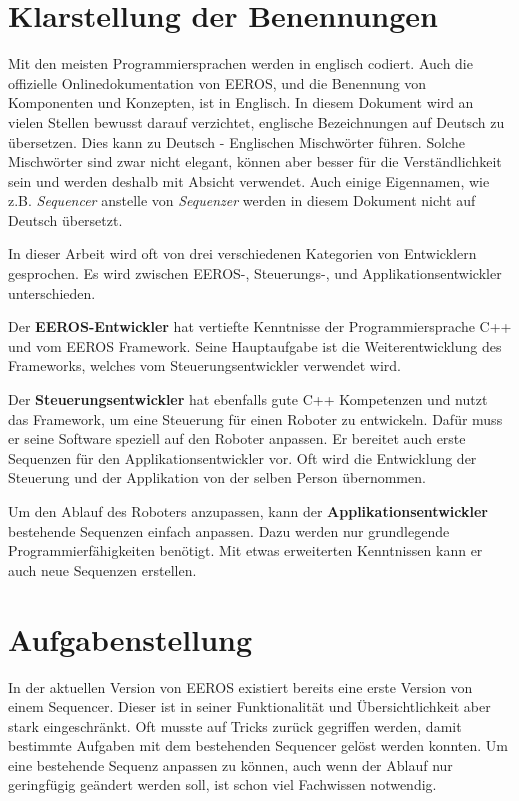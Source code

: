 \section{Klarstellung der Benennungen}
Mit den meisten Programmiersprachen werden in englisch codiert.
Auch die offizielle Onlinedokumentation \cite{eerosOrg} von EEROS, und die Benennung von Komponenten und Konzepten,  ist in Englisch.
In diesem Dokument wird an vielen Stellen bewusst darauf verzichtet, englische Bezeichnungen auf Deutsch zu übersetzen.
Dies kann zu Deutsch - Englischen Mischwörter führen.
Solche Mischwörter sind zwar nicht elegant, können aber besser für die Verständlichkeit sein und werden deshalb mit Absicht verwendet.
Auch einige Eigennamen, wie z.B. \textit{Sequencer} anstelle von \textit{Sequenzer} werden in diesem Dokument nicht auf Deutsch übersetzt.

In dieser Arbeit wird oft von drei verschiedenen Kategorien von Entwicklern gesprochen.
Es wird zwischen EEROS-, Steuerungs-, und Applikationsentwickler unterschieden.

Der \textbf{EEROS-Entwickler} hat vertiefte Kenntnisse der Programmiersprache C++ und vom EEROS Framework.
Seine Hauptaufgabe ist die Weiterentwicklung des Frameworks, welches vom Steuerungsentwickler verwendet wird.

Der \textbf{Steuerungsentwickler} hat ebenfalls gute C++ Kompetenzen und nutzt das Framework, um eine Steuerung für einen Roboter zu entwickeln.
Dafür muss er seine Software speziell auf den Roboter anpassen.
Er bereitet auch erste Sequenzen für den Applikationsentwickler vor.
Oft wird die Entwicklung der Steuerung und der Applikation von der selben Person übernommen.

Um den Ablauf des Roboters anzupassen, kann der \textbf{Applikationsentwickler} bestehende Sequenzen einfach anpassen.
Dazu werden nur grundlegende Programmierfähigkeiten benötigt.
Mit etwas erweiterten Kenntnissen kann er auch neue Sequenzen erstellen.



\section{Aufgabenstellung}
In der aktuellen Version von EEROS existiert bereits eine erste Version von einem Sequencer.
Dieser ist in seiner Funktionalität und Übersichtlichkeit aber stark eingeschränkt.
Oft musste auf Tricks zurück gegriffen werden, damit bestimmte Aufgaben mit dem bestehenden Sequencer gelöst werden konnten.
Um eine bestehende Sequenz anpassen zu können, auch wenn der Ablauf nur geringfügig geändert werden soll, ist schon viel Fachwissen notwendig.

